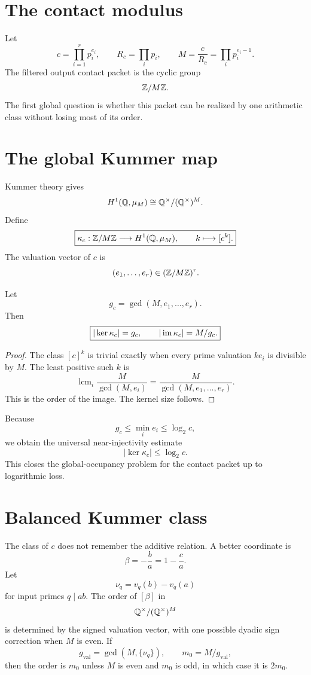 
\section{The contact modulus}
Let
\[
 c=\prod_{i=1}^{r}p_i^{e_i},
 \qquad
 R_c=\prod_i p_i,
 \qquad
 M=\frac{c}{R_c}
 =\prod_i p_i^{e_i-1}.
\]
The filtered output contact packet is the cyclic group
\[
 \mathbb Z/M\mathbb Z.
\]
The first global question is whether this packet can be realized by one arithmetic class without losing most of its order.

\section{The global Kummer map}
Kummer theory gives
\[
 H^1(\mathbb Q,\mu_M)
 \cong
 \mathbb Q^\times/(\mathbb Q^\times)^M.
\]
Define
\[
 \boxed{
 \kappa_c:
 \mathbb Z/M\mathbb Z
 \longrightarrow
 H^1(\mathbb Q,\mu_M),
 \qquad
 k\longmapsto[c^k].
 }
\]
The valuation vector of $c$ is
\[
 (e_1,\ldots,e_r)
 \in
 (\mathbb Z/M\mathbb Z)^r.
\]

\begin{theorem}
Let
\[
 g_c=\gcd(M,e_1,\ldots,e_r).
\]
Then
\[
 \boxed{
 |\ker\kappa_c|=g_c,
 \qquad
 |\operatorname{im}\kappa_c|=M/g_c.
 }
\]
\end{theorem}

\begin{proof}
The class $[c]^k$ is trivial exactly when every prime valuation $ke_i$ is divisible by $M$. The least positive such $k$ is
\[
 \operatorname{lcm}_i
 \frac{M}{\gcd(M,e_i)}
 =
 \frac{M}{\gcd(M,e_1,\ldots,e_r)}.
\]
This is the order of the image. The kernel size follows.
\end{proof}

Because
\[
 g_c\le\min_i e_i\le\log_2 c,
\]
we obtain the universal near-injectivity estimate
\[
 \boxed{
 |\ker\kappa_c|\le\log_2c.
 }
\]
This closes the global-occupancy problem for the contact packet up to logarithmic loss.

\section{Balanced Kummer class}
The class of $c$ does not remember the additive relation. A better coordinate is
\[
 \beta=-\frac ba=1-\frac ca.
\]
Let
\[
 \nu_q=v_q(b)-v_q(a)
\]
for input primes $q\mid ab$. The order of $[\beta]$ in
\[
 \mathbb Q^\times/(\mathbb Q^\times)^M
\]
is determined by the signed valuation vector, with one possible dyadic sign correction when $M$ is even. If
\[
 g_{\mathrm{val}}
 =
 \gcd(M,\{\nu_q\}),
 \qquad
 m_0=M/g_{\mathrm{val}},
\]
then the order is $m_0$ unless $M$ is even and $m_0$ is odd, in which case it is $2m_0$.

